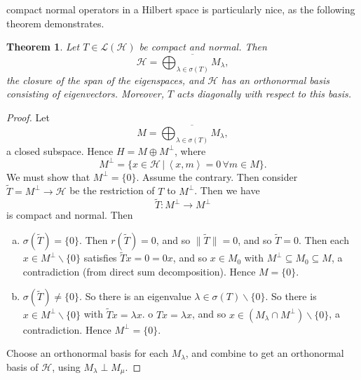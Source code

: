 \documentclass[justified]{tufte-book}
\theoremstyle{plain}%
\newtheorem{thm}{Theorem}[chapter]
\theoremstyle{definition}
\theoremstyle{remark}
\newcommand{\given}{ \, | \,}
\newcommand{\iprod}[1]{\left\langle #1 \right\rangle}
\begin{document}
 compact normal operators in a Hilbert space is particularly nice, as the following theorem demonstrates.
\begin{thm}
  Let $T \in \mathcal L(\mathcal H)$ be compact and normal.  Then \[
      \mathcal H = \overline{\bigoplus_{\lambda \in \sigma(T)} M_\lambda},
  \] the closure of the span of the eigenspaces, and $\mathcal H$ has an orthonormal basis consisting of eigenvectors.  Moreover, $T$ acts diagonally with respect to this basis.   
\end{thm}
\begin{proof}
  Let \[
      M = \overline{\bigoplus_{\lambda \in \sigma(T)} M_\lambda},
  \] a closed subspace.  Hence $H = M \oplus M^\perp$, where \[
  M^\perp = \{ x \in \mathcal H \given \iprod{x, m} = 0 \, \forall m \in M \}.
  \]   We must show that $M^\perp = \{ 0 \}$.  Assume the contrary.  Then consider $\tilde T = M^\perp \rightarrow \mathcal H$ be the restriction of $T$ to $M^\perp$.  Then we have \[
      \tilde T: M^\perp \rightarrow M^\perp
  \] is compact and normal. Then  \begin{enumerate}[(a)]
      \item $\sigma(\tilde T) = \{ 0 \}$.  Then $r(\tilde T) = 0$, and so $\| \tilde T \| = 0$, and so $\tilde T = 0$.  Then each $x \in M^\perp \backslash \{ 0 \}$ satisfies $\tilde T x = 0 = 0x$, and so $x \in M_0$ with $M^\perp \subseteq M_0 \subseteq M$, a contradiction (from direct sum decomposition).  Hence $M = \{ 0 \}$.  
      \item $\sigma(\tilde T) \neq \{ 0 \}$.  So there is an eigenvalue $\lambda \in \sigma(T) \backslash \{ 0 \}$.  So there is $x \in M^\perp \backslash \{ 0 \}$ with $\tilde T x = \lambda x$.  o $Tx = \lambda x$, and so $x \in (M_\lambda \cap M^\perp) \backslash \{ 0 \}$, a contradiction.  Hence $M^\perp = \{ 0 \}$.    
  \end{enumerate}
  
  Choose an orthonormal basis for each $M_\lambda$, and combine to get an orthonormal basis of $\mathcal H$, using $M_\lambda \perp M_\mu$.  
\end{proof}  




\end{document}
